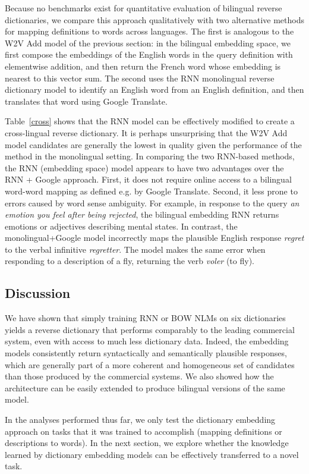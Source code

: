 \documentclass[11pt,letterpaper]{article}
\begin{document}
Because no benchmarks exist for quantitative evaluation of bilingual reverse dictionaries, we compare this approach qualitatively with two alternative methods for mapping definitions to words across languages. The first is analogous to the W2V Add model of the previous section: in the bilingual embedding space, we first compose the embeddings of the English words in the query definition with elementwise addition, and then return the French word whose embedding is nearest to this vector sum. The second uses the RNN monolingual reverse dictionary model to identify an English word from an English definition, and then translates that word using Google Translate.

Table~\ref{cross} shows that the RNN model can be effectively modified to create a cross-lingual reverse dictionary. It is perhaps unsurprising that the W2V Add model candidates are generally the lowest in quality given the performance of the method in the monolingual setting. In comparing the two RNN-based methods, the RNN (embedding space) model appears to have two advantages over the RNN + Google approach. First, it does not require online access to a bilingual word-word mapping as defined e.g. by Google Translate. Second, it less prone to errors caused by word sense ambiguity. For example, in response to the query \emph{an emotion you feel after being rejected}, the bilingual embedding RNN returns emotions or adjectives describing mental states. In contrast, the monolingual+Google model incorrectly maps the plausible English response \emph{regret} to the verbal infinitive \emph{regretter}. The model makes the same error when responding to a description of a fly, returning the verb \emph{voler} (to fly). 


\subsection{Discussion}

We have shown that simply training RNN or BOW NLMs on six dictionaries yields a reverse dictionary that performs comparably to the leading commercial system, even with access to much less dictionary data. Indeed, the embedding models consistently return syntactically and semantically plausible responses, which are generally part of a more coherent and homogeneous set of candidates than those produced by the commercial systems. We also showed how the architecture can be easily extended to produce bilingual versions of the same model. 

In the analyses performed thus far, we only test the dictionary embedding approach on tasks that it was trained to accomplish
 (mapping definitions or descriptions to words). In the next section, we explore whether the knowledge learned by dictionary embedding models can be effectively transferred to a novel task. 
\end{document}
